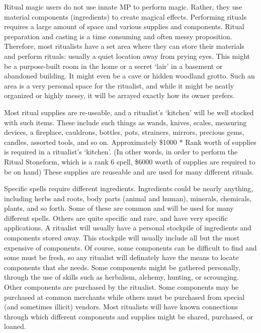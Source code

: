 \documentclass[twoside]{book}
\begin{document}
    {  
     Ritual magic users do not use innate MP to perform
               magic. Rather, they use material components (ingredients)
               to create magical effects. Performing rituals requires a
               large amount of space and various supplies and components.
               Ritual preparation and casting is a time consuming and
               often messy proposition. Therefore, most ritualists have a
               set area where they can store their materials and perform
               rituals: usually a quiet location away from prying eyes.
               This might be a purpose-built room in the home or a secret
               `lair' in a basement or abandoned building. It
               might even be a cave or hidden woodland grotto. Such an
               area is a very personal space for the ritualist, and while
               it might be neatly organized or highly messy, it will be
               arrayed exactly how its owner prefers. 
    }
  
    {  
     Most ritual supplies are re-useable, and a
               ritualist's `kitchen' will be well
               stocked with such items. These include such things as
               wands, knives, scales, measuring devices, a fireplace,
               cauldrons, bottles, pots, strainers, mirrors, precious
               gems, candles, assorted tools, and so on. Approximately
               \$1000 * Rank worth of supplies is required in a
               ritualist's `kitchen'. (In other words,
               in order to perform the Ritual Stoneform, which is a rank
               6 spell, \$6000 worth of supplies are required to be on
               hand) These supplies are reuseable and are used for many
               different rituals. 
    }
  
    {  
     Specific spells require different ingredients.
               Ingredients could be nearly anything, including herbs and
               roots, body parts (animal and human), minerals, chemicals,
               plants, and so forth. Some of these are common and will be
               used for many different spells. Others are quite specific
               and rare, and have very specific applications. A ritualist
               will usually have a personal stockpile of ingredients and
               components stored away. This stockpile will usually
               include all but the most expensive of components. Of
               course, some components can be difficult to find and some
               must be fresh, so any ritualist will definately have the
               means to locate components that she needs. Some components
               might be gathered personally, through the use of skills
               such as herbalism, alchemy, hunting, or scrounging. Other
               components are purchased by the ritualist. Some components
               may be purchased at common merchants while others must be
               purchased from special (and sometimes illicit) vendors.
               Most ritualists will have known connections through which
               different components and supplies might be shared,
               purchased, or loaned. 
    }
  
\end{document}
